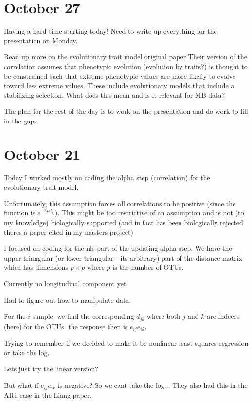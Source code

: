 \documentclass[10pt]{article}
\begin{document}
\section{October 27}

Having a hard time starting today! Need to write up everything for the presentation on Monday.

Read up more on the evolutionary trait model original paper \cite{Martins1997}
Their version of the correlation assumes that phenotypic evolution (evolution by traits?) is thought to be constrained such that extreme phenotypic values are more likeliy to evolve toward less extreme values. These include evolutionary models that include a stabilizing selection. What does this mean and is it relevant for MB data? 

The plan for the rest of the day is to work on the presentation and do work to fill in the gaps.



\section{October 21}


Today I worked mostly on coding the alpha step (correlation) for the evolutionary trait model.

Unfortunately, this assumption forces all correlations to be positive (since the function is $e^{-2\rho d_{ij}}$). This might be too restrictive of an assumption and is not (to my knowledge) biologically supported (and in fact has been biologically rejected theres a paper cited in my masters project)

I focused on coding for the nls part of the updating alpha step. We have the upper triangular (or lower triangular - its arbitrary) part of the distance matrix which has dimensions $p \times p$ where $p$ is the number of OTUs.

Currently no longitudinal component yet.

Had to figure out how to manipulate data.

For the $i$ sample, we find the corresponding $d_{jk}$ where both $j$ and  $k$ are indeces (here) for the OTUs. the response then is $e_{ij}e_{ik}$.

Trying to remember if we decided to make it be nonlinear least squares regression or take the log.

Lets just try the linear version?

But what if $e_{ij}e_{ik}$ is negative? So we cant take the log... They also had this in the AR1 case in the Liang paper.
\end{document}
